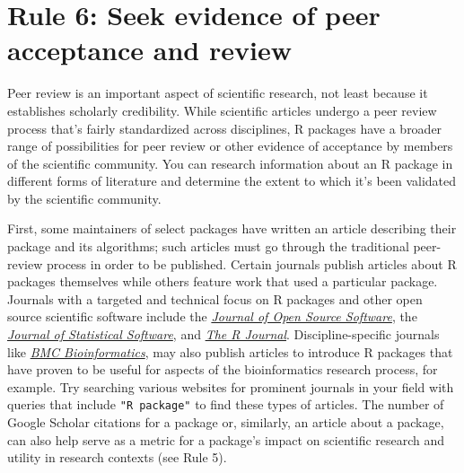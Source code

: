 \documentclass[10pt,letterpaper]{article}
\begin{document}
\hypertarget{rule-6-seek-evidence-of-peer-acceptance-and-review}{%
\section{Rule 6: Seek evidence of peer acceptance and
review}\label{rule-6-seek-evidence-of-peer-acceptance-and-review}}

Peer review is an important aspect of scientific research, not least
because it establishes scholarly credibility. While scientific articles
undergo a peer review process that's fairly standardized across
disciplines, R packages have a broader range of possibilities for peer
review or other evidence of acceptance by members of the scientific
community. You can research information about an R package in different
forms of literature and determine the extent to which it's been
validated by the scientific community.

First, some maintainers of select packages have written an article
describing their package and its algorithms; such articles must go
through the traditional peer-review process in order to be published.
Certain journals publish articles about R packages themselves while
others feature work that used a particular package. Journals with a
targeted and technical focus on R packages and other open source
scientific software include the
\href{https://joss.theoj.org/}{\emph{Journal of Open Source Software}},
the \href{https://www.jstatsoft.org/index}{\emph{Journal of Statistical
Software}}, and \href{https://journal.r-project.org/}{\emph{The R
Journal}}. Discipline-specific journals like
\href{https://bmcbioinformatics.biomedcentral.com/}{\emph{BMC
Bioinformatics}}, may also publish articles to introduce R packages that
have proven to be useful for aspects of the bioinformatics research
process, for example. Try searching various websites for prominent
journals in your field with queries that include \texttt{"R\ package"}
to find these types of articles. The number of Google Scholar citations
for a package or, similarly, an article about a package, can also help
serve as a metric for a package's impact on scientific research and
utility in research contexts (see Rule 5).
\end{document}
